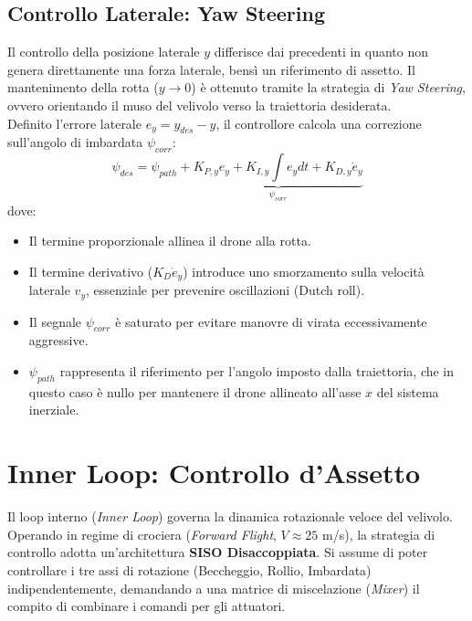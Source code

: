 \subsection{Controllo Laterale: Yaw Steering}
Il controllo della posizione laterale $y$ differisce dai precedenti in quanto non genera direttamente una forza laterale, bensì un riferimento di assetto. Il mantenimento della rotta ($y \to 0$) è ottenuto tramite la strategia di \textit{Yaw Steering}, ovvero orientando il muso del velivolo verso la traiettoria desiderata.
\\Definito l'errore laterale $e_y = y_{des} - y$, il controllore calcola una correzione sull'angolo di imbardata $\psi_{corr}$:
\begin{equation}
    \psi_{des} = \psi_{path} + \underbrace{K_{P,y} e_y + K_{I,y} \int e_y dt + K_{D,y} \dot{e}_y}_{\psi_{corr}}
\end{equation}
dove:
\begin{itemize}
    \item Il termine proporzionale allinea il drone alla rotta.
    \item Il termine derivativo ($K_D \dot{e}_y$) introduce uno smorzamento sulla velocità laterale $v_y$, essenziale per prevenire oscillazioni (Dutch roll).
    \item Il segnale $\psi_{corr}$ è saturato per evitare manovre di virata eccessivamente aggressive.
    \item $\psi_{path}$ rappresenta il riferimento per l'angolo imposto dalla traiettoria, che in questo caso è nullo per mantenere il drone allineato all'asse $x$ del sistema inerziale.
\end{itemize}
\clearpage

\section{Inner Loop: Controllo d'Assetto}

Il loop interno (\textit{Inner Loop}) governa la dinamica rotazionale veloce del velivolo. Operando in regime di crociera (\textit{Forward Flight}, $V \approx 25$ m/s), la strategia di controllo adotta un'architettura \textbf{SISO Disaccoppiata}. 
Si assume di poter controllare i tre assi di rotazione (Beccheggio, Rollio, Imbardata) indipendentemente, demandando a una matrice di miscelazione (\textit{Mixer}) il compito di combinare i comandi per gli attuatori.

